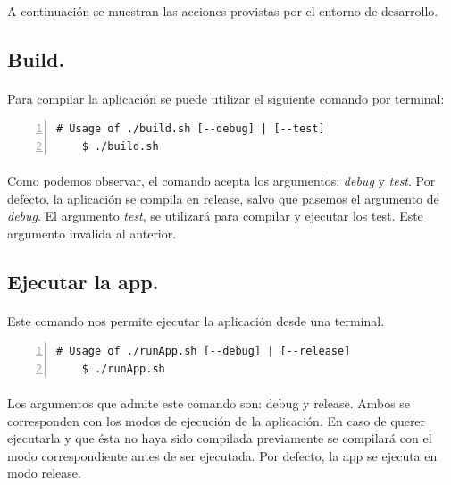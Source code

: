 \paragraph{}A continuación se muestran las acciones provistas por el entorno de desarrollo.

\subsection{Build.}

\paragraph{}Para compilar la aplicación se puede utilizar el siguiente comando por
terminal:

\begin{lstlisting}[style=consola, numbers=left]
    # Usage of ./build.sh [--debug] | [--test]
    $ ./build.sh
\end{lstlisting}

\paragraph{}Como podemos observar, el comando acepta los argumentos: \emph{debug} y
\emph{test}. Por defecto, la aplicación se compila en \gls{release}, salvo que pasemos
el argumento de \emph{debug}. El argumento \emph{test}, se utilizará para compilar y
ejecutar los test. Este argumento invalida al anterior.

\subsection{Ejecutar la app.}

\paragraph{}Este comando nos permite ejecutar la aplicación desde una terminal.

\begin{lstlisting}[style=consola, numbers=left]
    # Usage of ./runApp.sh [--debug] | [--release]
    $ ./runApp.sh
\end{lstlisting}

\paragraph{}Los argumentos que admite este comando son: \gls{debug} y \gls{release}.
Ambos se corresponden con los modos de ejecución de la aplicación. En caso de querer
ejecutarla y que ésta no haya sido compilada previamente se compilará con el modo
correspondiente antes de ser ejecutada. Por defecto, la app se ejecuta en modo \gls{release}.

